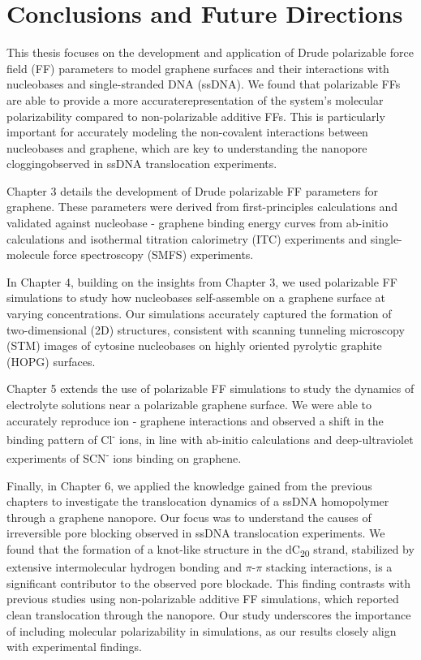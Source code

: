 \chapter[Conclusions and Future Directions]{Conclusions and Future Directions}
\justifying
This thesis focuses on the development and application of Drude polarizable force field (FF) parameters to model graphene surfaces and their interactions with nucleobases and single-stranded DNA (ssDNA). We found that polarizable FFs are able to provide a more accuraterepresentation of the system's molecular polarizability compared to non-polarizable additive FFs. This is particularly important for accurately modeling the non-covalent interactions between nucleobases and graphene, which are key to understanding the nanopore cloggingobserved in ssDNA translocation experiments.

Chapter 3 details the development of Drude polarizable FF parameters for graphene. These parameters were derived from first-principles calculations and validated against nucleobase - graphene binding energy curves from ab-initio calculations and isothermal titration calorimetry (ITC) experiments and single-molecule force spectroscopy (SMFS) experiments. 	

In Chapter 4, building on the insights from Chapter 3, we used polarizable FF simulations to study how nucleobases self-assemble on a graphene surface at varying concentrations. Our simulations accurately captured the formation of two-dimensional (2D) structures, consistent with scanning tunneling microscopy (STM) images of cytosine nucleobases on highly oriented pyrolytic graphite (HOPG) surfaces.

Chapter 5 extends the use of polarizable FF simulations to study the dynamics of electrolyte solutions near a polarizable graphene surface. We were able to accurately reproduce ion - graphene interactions and observed a shift in the binding pattern of Cl\textsuperscript{-} ions, in line with ab-initio calculations and deep-ultraviolet experiments of SCN\textsuperscript{-} ions binding on graphene.

Finally, in Chapter 6, we applied the knowledge gained from the previous chapters to investigate the translocation dynamics of a ssDNA homopolymer through a graphene nanopore. Our focus was to understand the causes of irreversible pore blocking observed in ssDNA translocation experiments. We found that the formation of a knot-like structure in the dC\textsubscript{20} strand, stabilized by extensive intermolecular hydrogen bonding and $\pi$-$\pi$ stacking interactions, is a significant contributor to the observed pore blockade. This finding contrasts with previous studies using non-polarizable additive FF simulations, which reported clean translocation through the nanopore. Our study underscores the importance of including molecular polarizability in simulations, as our results closely align with experimental findings.

